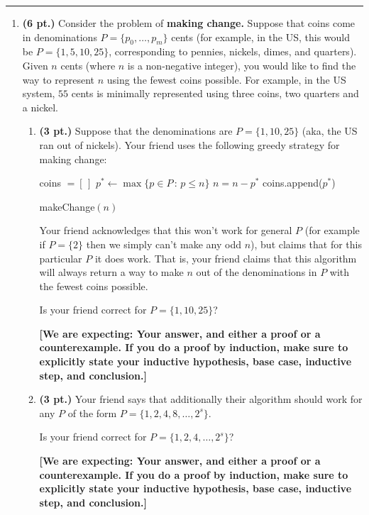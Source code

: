 \documentclass{article}
\newcommand{\expecting}[1]{\noindent\textbf{[We are expecting: #1]}}
\newcommand{\pts}[1]{\textbf{(#1 pt.)}}
\begin{document}
\noindent
\rule{\linewidth}{0.4pt}


\begin{enumerate}

\item\pts{6} Consider the problem of \textbf{making change.} Suppose that coins come in denominations $P = \{p_0,\ldots,p_m\}$ cents (for example, in the US, this would be $P = \{1,5,10,25\}$, corresponding to pennies, nickels, dimes, and quarters).  Given $n$ cents (where $n$ is a non-negative integer), you would like to find the way to represent $n$ using the fewest coins possible.  For example, in the US system, $55$ cents is minimally represented using three coins, two quarters and a nickel.

\begin{enumerate}
\item\pts{3} Suppose that the denominations are $P = \{1,10,25\}$ (aka, the US ran out of nickels).  Your friend uses the following greedy strategy for making change:

\begin{algorithm}[h]
coins $= [\,]$\;
{
	$p^* \gets \max \{ p \in P \,:\, p \leq n \}$\;
	$n = n - p^*$\;
	coins.append($p^*$) \;
}
\caption{makeChange$(n)$}
\end{algorithm}
Your friend acknowledges that this won't work for general $P$ (for example if $P = \{2\}$ then we simply can't make any odd $n$), but claims that for this particular $P$ it does work.   
That is, your friend claims that this algorithm will always return a way to make $n$ out of the denominations in $P$ with the fewest coins possible. 

Is your friend correct for $P = \{1,10,25\}$?

\expecting{Your answer, and either a proof or a counterexample.  
If you do a proof by induction, make sure to explicitly state your inductive hypothesis, base case, inductive step, and conclusion.}

\item\pts{3}  Your friend says that additionally their algorithm should work for any $P$ of the form $P = \{1,2,4,8,\ldots, 2^s\}$.

Is your friend correct for $P = \{1,2,4,\ldots, 2^s\}$?

\expecting{Your answer, and either a proof or a counterexample.
If you do a proof by induction, make sure to explicitly state your inductive hypothesis, base case, inductive step, and conclusion.}


\end{enumerate}
\end{enumerate}
\end{document}
